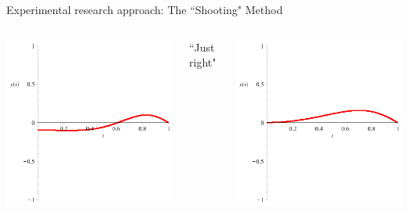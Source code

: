 \documentclass{beamer}
\begin{document}
\begin{frame}{Experimental research approach: The ``Shooting" Method}
\begin{columns}
\vspace{2mm}

\includegraphics[scale=0.25]{Undershoot.png}


``Just right"

\vspace{2mm}

\includegraphics[scale=0.25]{JustRight.png}

\end{columns}

\end{frame}
\end{document}
